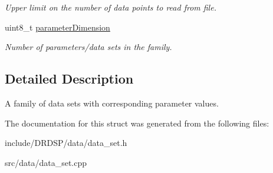 \begin{DoxyCompactItemize}
\begin{DoxyCompactList}\small\item\em Upper limit on the number of data points to read from file. \end{DoxyCompactList}\item 
\hypertarget{struct_d_r_d_s_p_1_1_data_system_ae4c6d5195272938097c0f9b01c18b4e0}{uint8\-\_\-t \hyperlink{struct_d_r_d_s_p_1_1_data_system_ae4c6d5195272938097c0f9b01c18b4e0}{parameter\-Dimension}}\label{struct_d_r_d_s_p_1_1_data_system_ae4c6d5195272938097c0f9b01c18b4e0}

\begin{DoxyCompactList}\small\item\em Number of parameters/data sets in the family. \end{DoxyCompactList}\end{DoxyCompactItemize}


\subsection{Detailed Description}
A family of data sets with corresponding parameter values. 

The documentation for this struct was generated from the following files\-:\begin{DoxyCompactItemize}
\item 
include/\-D\-R\-D\-S\-P/data/data\-\_\-set.\-h\item 
src/data/data\-\_\-set.\-cpp\end{DoxyCompactItemize}
